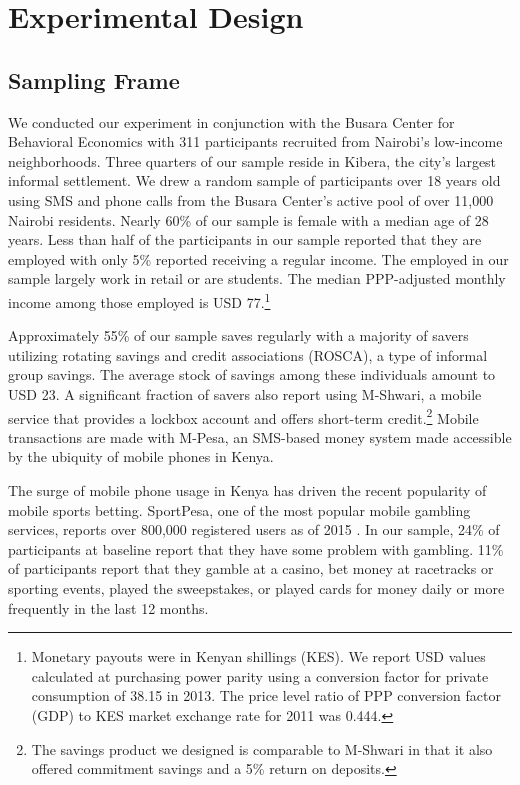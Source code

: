 \documentclass[11pt]{article}
\begin{document}
\section{Experimental Design} \label{sec:design}

	\subsection{Sampling Frame}

		We conducted our experiment in conjunction with the Busara Center for Behavioral Economics with 311 participants recruited from Nairobi's low-income neighborhoods. Three quarters of our sample reside in Kibera, the city's largest informal settlement. We drew a random sample of participants over 18 years old using SMS and phone calls from the Busara Center's active pool of over 11,000 Nairobi residents. Nearly 60\% of our sample is female with a median age of 28 years. Less than half of the participants in our sample reported that they are employed with only 5\% reported receiving a regular income. The employed in our sample largely work in retail or are students. The median PPP-adjusted monthly income among those employed is USD 77.\footnote{Monetary payouts were in Kenyan shillings (KES). We report USD values calculated at purchasing power parity using a conversion factor for private consumption of 38.15 in 2013. The price level ratio of PPP conversion factor (GDP) to KES market exchange rate for 2011 was 0.444.}

		Approximately 55\% of our sample saves regularly with a majority of savers utilizing rotating savings and credit associations (ROSCA), a type of informal group savings. The average stock of savings among these individuals amount to USD 23. A significant fraction of savers also report using M-Shwari, a mobile service that provides a lockbox account and offers short-term credit.\footnote{The savings product we designed is comparable to M-Shwari in that it also offered commitment savings and a 5\% return on deposits.} Mobile transactions are made with M-Pesa, an SMS-based money system made accessible by the ubiquity of mobile phones in Kenya.

		The surge of mobile phone usage in Kenya has driven the recent popularity of mobile sports betting. SportPesa, one of the most popular mobile gambling services, reports over 800,000 registered users as of 2015 \parencite{kemibaro_sportpesa_2015}. In our sample, 24\% of participants at baseline report that they have some problem with gambling. 11\% of participants report that they gamble at a casino, bet money at racetracks or sporting events, played the sweepstakes, or played cards for money daily or more frequently in the last 12 months.
\end{document}
